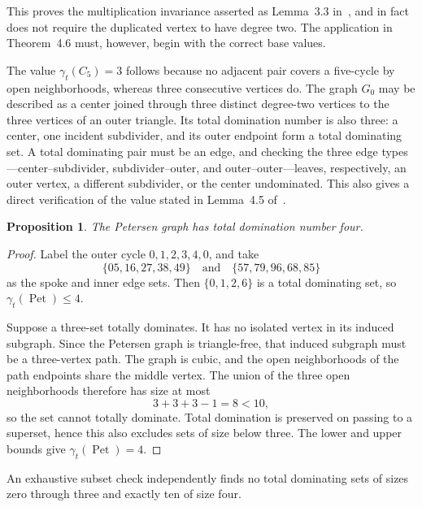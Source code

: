 \documentclass[11pt]{article}
\newtheorem{proposition}[theorem]{Proposition}
\theoremstyle{remark}
\newcommand{\Petersen}{\operatorname{Pet}}
\begin{document}
This proves the multiplication invariance asserted as Lemma~3.3
in~\cite{Bera2026}, and in fact does not require the duplicated vertex to have
degree two.  The application in Theorem~4.6 must, however, begin with the
correct base values.

The value \(\gamma_t(C_5)=3\) follows because no adjacent pair covers a
five-cycle by open neighborhoods, whereas three consecutive vertices do.  The
graph \(G_0\) may be described as a center joined through three distinct
degree-two vertices to the three vertices of an outer triangle.  Its total
domination number is also three: a center, one incident subdivider, and its
outer endpoint form a total dominating set.  A total dominating pair must be
an edge, and checking the three edge types---center--subdivider,
subdivider--outer, and outer--outer---leaves, respectively, an outer vertex, a
different subdivider, or the center undominated.  This also gives a direct
verification of the value stated in Lemma~4.5 of~\cite{Bera2026}.

\begin{proposition}\label{prop:petersen}
The Petersen graph has total domination number four.
\end{proposition}

\begin{proof}
Label the outer cycle \(0,1,2,3,4,0\), and take
\[
\{05,16,27,38,49\}
\quad\text{and}\quad
\{57,79,96,68,85\}
\]
as the spoke and inner edge sets.  Then
\(\{0,1,2,6\}\) is a total dominating set, so \(\gamma_t(\Petersen)\leq4\).

Suppose a three-set totally dominates.  It has no isolated vertex in its
induced subgraph.  Since the Petersen graph is triangle-free, that induced
subgraph must be a three-vertex path.  The graph is cubic, and the open
neighborhoods of the path endpoints share the middle vertex.  The union of the
three open neighborhoods therefore has size at most
\[
3+3+3-1=8<10,
\]
so the set cannot totally dominate.  Total domination is preserved on passing
to a superset, hence this also excludes sets of size below three.  The lower
and upper bounds give \(\gamma_t(\Petersen)=4\).
\end{proof}

An exhaustive subset check independently finds no total dominating sets of
sizes zero through three and exactly ten of size four.
\end{document}
